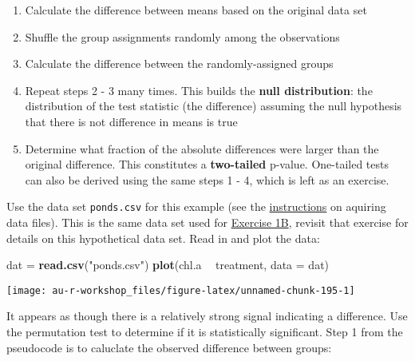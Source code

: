 \documentclass[]{book}
\newenvironment{Shaded}{\begin{snugshade}}{\end{snugshade}}
\newcommand{\KeywordTok}[1]{\textcolor[rgb]{0.13,0.29,0.53}{\textbf{#1}}}
\newcommand{\DataTypeTok}[1]{\textcolor[rgb]{0.13,0.29,0.53}{#1}}
\newcommand{\StringTok}[1]{\textcolor[rgb]{0.31,0.60,0.02}{#1}}
\newcommand{\OperatorTok}[1]{\textcolor[rgb]{0.81,0.36,0.00}{\textbf{#1}}}
\newcommand{\NormalTok}[1]{#1}
\providecommand{\tightlist}{%
  \setlength{\itemsep}{0pt}\setlength{\parskip}{0pt}}
\theoremstyle{definition}
\theoremstyle{definition}
\theoremstyle{definition}
\theoremstyle{remark}
\begin{document}
\begin{enumerate}
\def\labelenumi{\arabic{enumi}.}
\tightlist
\item
  Calculate the difference between means based on the original data set
\item
  Shuffle the group assignments randomly among the observations
\item
  Calculate the difference between the randomly-assigned groups
\item
  Repeat steps 2 - 3 many times. This builds the \textbf{null
  distribution}: the distribution of the test statistic (the difference)
  assuming the null hypothesis that there is not difference in means is
  true
\item
  Determine what fraction of the absolute differences were larger than
  the original difference. This constitutes a \textbf{two-tailed}
  p-value. One-tailed tests can also be derived using the same steps 1 -
  4, which is left as an exercise.
\end{enumerate}

Use the data set \texttt{ponds.csv} for this example (see the
\protect\hyperlink{data-sets}{instructions} on aquiring data files).
This is the same data set used for \protect\hyperlink{ex1b}{Exercise
1B}, revisit that exercise for details on this hypothetical data set.
Read in and plot the data:

\begin{Shaded}
\begin{Highlighting}[]
\NormalTok{dat =}\StringTok{ }\KeywordTok{read.csv}\NormalTok{(}\StringTok{"ponds.csv"}\NormalTok{)}
\KeywordTok{plot}\NormalTok{(chl.a }\OperatorTok{~}\StringTok{ }\NormalTok{treatment, }\DataTypeTok{data =}\NormalTok{ dat)}
\end{Highlighting}
\end{Shaded}

\begin{center}\texttt{[image: au-r-workshop\_files/figure-latex/unnamed-chunk-195-1]} \end{center}

It appears as though there is a relatively strong signal indicating a
difference. Use the permutation test to determine if it is statistically
significant. Step 1 from the pseudocode is to caluclate the observed
difference between groups:

\begin{Shaded}
\end{Shaded}
\end{document}
